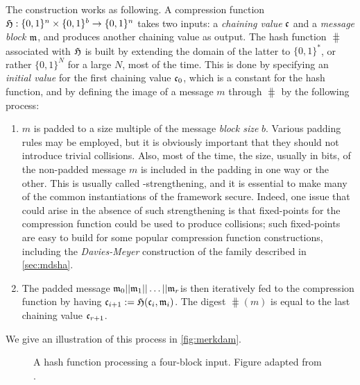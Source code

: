 The construction works as following. A compression function $\operatorname{\mathfrak{H}} : \{0,1\}^n \times \{0,1\}^b \rightarrow \{0,1\}^n$
takes two inputs: a \emph{chaining value} $\mathfrak{c}$ and a \emph{message block} $\mathfrak{m}$, and produces another chaining value as output.
The hash function $\hash$ associated with $\operatorname{\mathfrak{H}}$ is built by extending the domain of the latter to $\{0,1\}^*$, or rather $\{0,1\}^N$ for a large $N$, most of the time.
This is done by specifying an \emph{initial value} \iv for the first chaining value $\mathfrak{c}_0$, which is a constant for the hash function, and by defining the image
of a message $m$ through $\hash$ by the following process:
\begin{enumerate}
\item $m$ is padded to a size multiple of the message \emph{block size} $b$. Various padding rules may be employed, but it is obviously important that they should not
introduce trivial collisions. Also, most of the time, the size, usually in bits, of the non-padded message $m$ is included in the padding in one way or the other.
This is usually called \merkdam-strengthening, and it is essential to make many of the common instantiations of the framework secure. Indeed, one issue that
could arise in the absence of such strengthening is that fixed-points for the compression function could be used to produce collisions; such fixed-points
are easy to build for some popular compression function constructions, including the \emph{Davies-Meyer} construction
of the \mdsha family described in \autoref{sec:mdsha}.
\item The padded message $\messblock_0||\messblock_1||\linebreak\ldots||\messblock_r$is then iteratively fed to the compression function by having
$\mathfrak{c}_{i+1} := \operatorname{\mathfrak{H}}(\mathfrak{c}_i, \mathfrak{m}_i)$. The digest $\hash(m)$ is equal to the last
chaining value $\mathfrak{c}_{r+1}$.
\end{enumerate}
We give an illustration of this process in \autoref{fig:merkdam}.

\begin{figure}[!htb]
\begin{center}

\caption[A \merkdam hash function processing a four-block input.]{A \merkdam hash function processing a four-block input. Figure adapted from \cite{TiKZ:Cryptographers}.\label{fig:merkdam}}
\end{center}
\end{figure}

